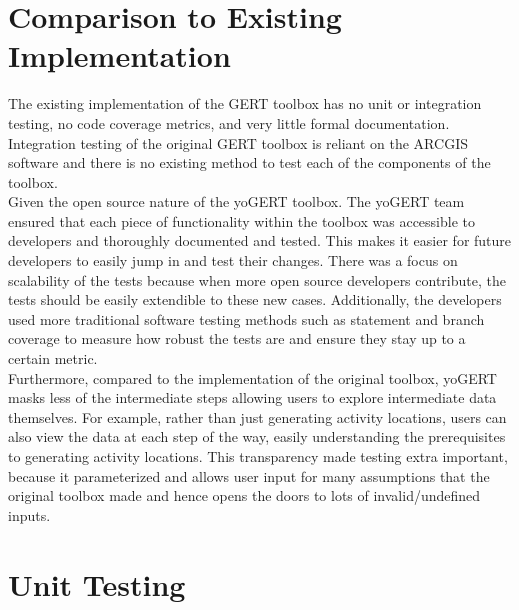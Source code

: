 \documentclass[12pt, titlepage]{article}
\begin{document}
\newpage 

\section{Comparison to Existing Implementation}	

The existing implementation of the GERT toolbox has no unit or integration testing, no code coverage metrics, and very little formal documentation. Integration testing of the original GERT toolbox is reliant on the ARCGIS software and there is no existing method to test each of the components of the toolbox. \\

\noindent Given the open source nature of the yoGERT toolbox. The yoGERT team ensured that each piece of functionality within the toolbox was accessible to developers and thoroughly documented and tested. This makes it easier for future developers to easily jump in and test their changes. There was a focus on scalability of the tests because when more open source developers contribute, the tests should be easily extendible to these new cases. Additionally, the developers used more traditional software testing methods such as statement and branch coverage to measure how robust the tests are and ensure they stay up to a certain metric.  \\

\noindent Furthermore, compared to the implementation of the original toolbox, yoGERT masks less of the intermediate steps allowing users to explore intermediate data themselves. For example, rather than just generating activity locations, users can also view the data at each step of the way, easily understanding the prerequisites to generating activity locations. This transparency made testing extra important, because it parameterized and allows user input for many assumptions that the original toolbox made and hence opens the doors to lots of invalid/undefined inputs. 

\section{Unit Testing}
\end{document}
